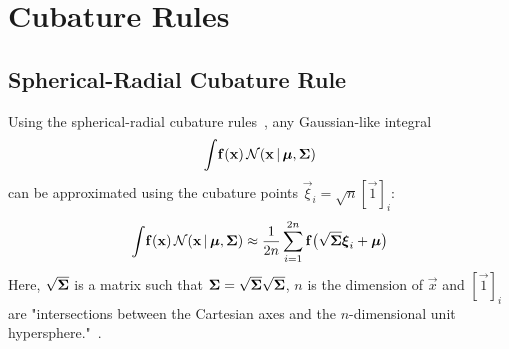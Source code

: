 \section{Cubature Rules}

\subsection{Spherical-Radial Cubature Rule}
	Using the spherical-radial cubature rules~\cite{solinCubatureIntegrationMethods2010}, any Gaussian-like integral
	\begin{equation*}
		\int\! \boldsymbol{\mathrm{f}}(\boldsymbol{\mathrm{x}}) \,\mathcal{N}(\boldsymbol{\mathrm{x}} \,\vert\, \boldsymbol{\mathrm{\mu}}, \boldsymbol{\mathrm{\Sigma}})
	\end{equation*}
	can be approximated using the cubature points \( \vec{\xi}_i = \sqrt{n} [\vec{1}]_i \):
	\begin{equation}
		\int\! \boldsymbol{\mathrm{f}}(\boldsymbol{\mathrm{x}}) \,\mathcal{N}(\boldsymbol{\mathrm{x}} \,\vert\, \boldsymbol{\mathrm{\mu}}, \boldsymbol{\mathrm{\Sigma}}) \approx \frac{1}{2n} \sum_{i = 1}^{2n} \boldsymbol{\mathrm{f}}\big( \sqrt{\boldsymbol{\mathrm{\Sigma}}} \boldsymbol{\mathrm{\xi}}_i + \boldsymbol{\mathrm{\mu}} \big)  \label{eq:sphericalRadialGaussianCubatureRule}
	\end{equation}
	Here, \( \sqrt{\boldsymbol{\mathrm{\Sigma}}} \) is a matrix such that \( \boldsymbol{\mathrm{\Sigma}} = \sqrt{\boldsymbol{\mathrm{\Sigma}}} \sqrt{\boldsymbol{\mathrm{\Sigma}}} \), \(n\) is the dimension of \(\vec{x}\) and \( [\vec{1}]_i \) are "intersections between the Cartesian axes and the \(n\)-dimensional unit hypersphere."~\cite{solinCubatureIntegrationMethods2010}.
